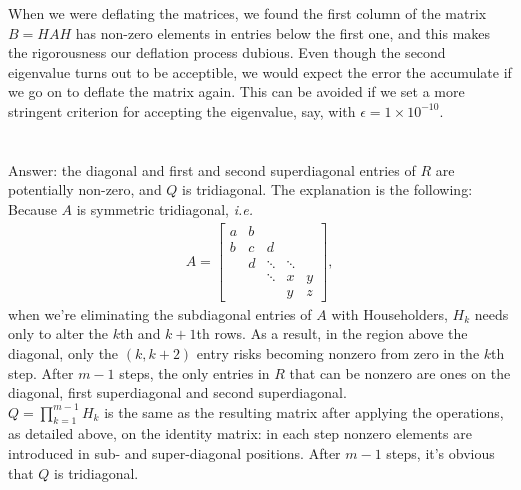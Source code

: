 \documentclass[11pt]{article}
\begin{document}
When we were deflating the matrices, we found the first column of the matrix $B=HAH$ has non-zero elements in entries below the first one, and this makes the rigorousness our deflation process dubious. Even though the second eigenvalue turns out to be acceptible, we would expect the error the accumulate if we go on to deflate the matrix again. This can be avoided if we set a more stringent criterion for accepting the eigenvalue, say, with $\epsilon=1\times10^{-10}$. 
\pagebreak
\section{}
\subsection{}
Answer: the diagonal and first and second superdiagonal entries of $R$ are potentially non-zero, and $Q$ is tridiagonal. The explanation is the following:\\[0.3cm]
Because $A$ is symmetric tridiagonal, \textit{i.e.} 
\begin{equation}\begin{split} 
A = \begin{bmatrix} 
a & b\\
b & c & d\\
& d & \ddots & \ddots\\
& & \ddots & x  & y \\
& & & y & z
\end{bmatrix},
\end{split}\nonumber\end{equation} 
when we're eliminating the subdiagonal entries of $A$ with Householders, $H_k$ needs only to alter the $k$th and $k+1$th rows. As a result, in the region above the diagonal, only the $(k,k+2)$ entry risks becoming nonzero from zero in the $k$th step. After $m-1$ steps, the only entries in $R$ that can be nonzero are ones on the diagonal, first superdiagonal and second superdiagonal. \\[0.3cm]
$Q=\prod_{k=1}^{m-1}H_k$ is the same as the resulting matrix after applying the operations, as detailed above, on the identity matrix: in each step nonzero elements are introduced in sub- and super-diagonal positions. After $m-1$ steps, it's obvious that $Q$ is tridiagonal.
\end{document}
